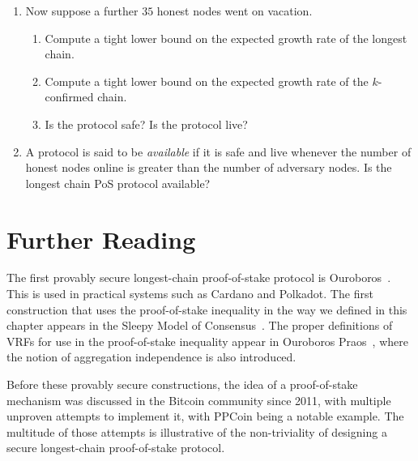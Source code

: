 \begin{problems}
\begin{enumerate}
            full $80$ honest nodes online, $30$ of them decide not to participate in
            the protocol and went on vacation to Ikaria. However, the protocol
            designer does not know this and the protocol parameters are not
            adjusted.
            \begin{enumerate}
                \item Compute a tight lower bound on the expected growth
                    rate of the longest chain.
                \item Compute a tight lower bound on the growth rate of
                    the $k$-confirmed chain.
                \item Is the protocol safe? Is the protocol live?
            \end{enumerate}
        \item Now suppose a further $35$ honest nodes went on vacation.
            \begin{enumerate}
                \item Compute a tight lower bound on the expected growth
                    rate of the longest chain.
                \item Compute a tight lower bound on the expected growth
                    rate of the $k$-confirmed chain.
                \item Is the protocol safe? Is the protocol live?
            \end{enumerate}
        \item A protocol is said to be {\em available} if it is safe and
            live whenever the number of honest nodes online is greater than the
            number of adversary nodes. Is the longest chain PoS protocol available?
    \end{enumerate}
\end{problems}

\section*{Further Reading}

The first provably secure longest-chain proof-of-stake protocol is Ouroboros~\cite{ouroboros}.
This is used in practical systems such as Cardano and Polkadot. The first
construction that uses the proof-of-stake inequality in the way we defined in this chapter
appears in the Sleepy Model of Consensus~\cite{sleepy-model}. The proper definitions of
VRFs for use in the proof-of-stake inequality appear in Ouroboros Praos~\cite{praos},
where the notion of aggregation independence is also introduced.

Before these provably secure constructions, the idea of a proof-of-stake mechanism was
discussed in the Bitcoin community since 2011, with multiple unproven attempts to implement it,
with PPCoin being a notable example. The multitude of those attempts is illustrative of the
non-triviality of designing a secure longest-chain proof-of-stake protocol.